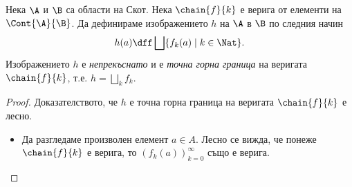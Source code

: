 \begin{framed}
  \begin{lemma}
    Нека $\A$ и $\B$ са области на Скот.
    Нека $\chain{f}{k}$ е верига от елементи на $\Cont{\A}{\B}$.
    Да дефинираме изображението $h$ на $\A$ в $\B$ по следния начин
    \[h(a) \dff \bigsqcup\{f_k(a) \mid k \in \Nat\}.\]
    Изображението $h$ е {\em непрекъснато} и е {\em точна горна граница} на веригата $\chain{f}{k}$,
    т.е. $h = \bigsqcup_k f_k$.
  \end{lemma}
\end{framed}
\begin{proof}
  \ifhints
  Доказателството, че $h$ е точна горна граница на веригата $\chain{f}{k}$ е лесно.
  \begin{itemize}
  \item 
    Да разгледаме произволен елемент $a \in A$.
    Лесно се вижда, че понеже $\chain{f}{k}$ е верига, то $(f_k(a))^\infty_{k=0}$ също е верига.


\end{itemize}
\end{proof}

